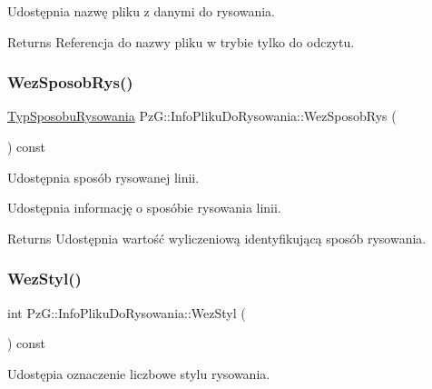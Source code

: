 Udostępnia nazwę pliku z danymi do rysowania. \begin{DoxyReturn}{Returns}
Referencja do nazwy pliku w trybie tylko do odczytu. 
\end{DoxyReturn}
\mbox{\label{class_pz_g_1_1_info_pliku_do_rysowania_a04e42126ae7873117b96c39f31e0a206}} 
\subsubsection{\texorpdfstring{WezSposobRys()}{WezSposobRys()}}
{\footnotesize\ttfamily \mbox{\hyperlink{namespace_pz_g_a53d89f50686ddd39301f9706cc1247dc}{Typ\+Sposobu\+Rysowania}} Pz\+G\+::\+Info\+Pliku\+Do\+Rysowania\+::\+Wez\+Sposob\+Rys (\begin{DoxyParamCaption}{ }\end{DoxyParamCaption}) const\hspace{0.3cm}{\ttfamily [inline]}}



Udostępnia sposób rysowanej linii. 

Udostępnia informację o sposóbie rysowania linii. \begin{DoxyReturn}{Returns}
Udostępnia wartość wyliczeniową identyfikującą sposób rysowania. 
\end{DoxyReturn}
\mbox{\label{class_pz_g_1_1_info_pliku_do_rysowania_acf5b136a9ee8a3308fdba974d0eebd9a}} 
\subsubsection{\texorpdfstring{WezStyl()}{WezStyl()}}
{\footnotesize\ttfamily int Pz\+G\+::\+Info\+Pliku\+Do\+Rysowania\+::\+Wez\+Styl (\begin{DoxyParamCaption}{ }\end{DoxyParamCaption}) const\hspace{0.3cm}{\ttfamily [inline]}}



Udostępia oznaczenie liczbowe stylu rysowania. 

